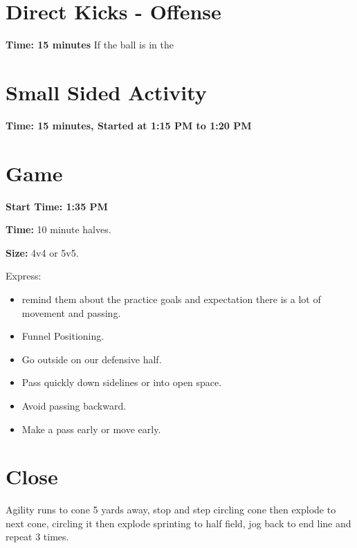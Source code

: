 \documentclass[10pt,letterpaper]{article}
\newenvironment{evenBlock}[1]{%
    \tcolorbox[beamer,%
    noparskip,breakable,
    colback=LightGreen,colframe=DarkGreen,%
    colbacklower=LimeGreen!75!LightGreen,%
    title=#1]}%
    {\endtcolorbox}
\newenvironment{oddBlock}[1]{%
    \tcolorbox[beamer,%
    noparskip,breakable,
    colback=LightBlue,colframe=DarkBlue,%
    colbacklower=DarkBlue!75!LightBlue,%
    title=#1]}%
    {\endtcolorbox}
\begin{document}
\section{Direct Kicks - Offense}
\textbf{Time: 15 minutes}
\begin{evenBlock}{Positions}
    If the ball is in the 
\end{evenBlock}

\section{Small Sided Activity}
\textbf{Time: 15 minutes, Started at 1:15 PM to 1:20 PM}



\section{Game}

\textbf{Start Time: 1:35 PM}

\begin{oddBlock}{Small Sided}
    \textbf{Time:} 10 minute halves.

    \textbf{Size:} 4v4 or 5v5.

    Express:
    \begin{itemize}
        \setlength{\itemsep}{0pt}
        \setlength{\parskip}{0pt}
        \setlength{\parsep}{0pt}
        \item  remind them about the practice goals and expectation there is a lot of movement and passing.
        \item Funnel Positioning.
        \item Go outside on our defensive half.
        \item Pass quickly down sidelines or into open space.
        \item Avoid passing backward.
        \item Make a pass early or move early.
    \end{itemize}

\end{oddBlock}

\section{Close}
\begin{oddBlock}{Sprints (5 min)}
    Agility runs to cone 5 yards away, stop and step circling cone then explode to next cone, circling it then explode sprinting to half field, jog back to end line and repeat 3 times.
\end{oddBlock}
\end{document}
